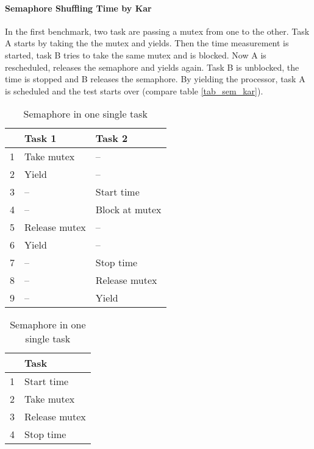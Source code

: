 \paragraph{Semaphore Shuffling Time by Kar}
In the first benchmark, two task are passing a mutex from one to the other.
Task A starts by taking the the mutex and yields.
Then the time measurement is started, task B tries to take the same mutex and is blocked.
Now A is rescheduled, releases the semaphore and yields again.
Task B is unblocked, the time is stopped and B releases the semaphore.
By yielding the processor, task A is scheduled and the test starts over (compare table \ref{tab_sem_kar}).

\begin{table}[htbp]
\begin{minipage}[t]{0.45\textwidth}
	\begin{center}
		\begin{tabular}{|l|l|l|}
			\hline
				& Task 1							& Task 2						\\
				\hline 
			  1 & Take mutex					& --								\\
			  2 & Yield								& --								\\
			  3 & --									& Start time				\\ 
			  4 & --									& Block at mutex		\\
			  5 & Release mutex				& --								\\
			  6 & Yield								& --								\\
			  7 & --									& Stop time					\\ 
			  8 & --									& Release mutex			\\
			  9 & --									& Yield							\\			  
			\hline
		\end{tabular}
	\caption{Semaphore Shuffling Time proposed by Kar}
	\label{tab_sem_kar}
	\end{center}
	\end{minipage} \hfill 
	\begin{minipage}[t]{0.45\textwidth}
	\begin{center}
		\begin{tabular}{|l|l|}
			\hline
				& Task 							\\
				\hline 
				1 & Start time				\\ 
			  2 & Take mutex				\\
				3 & Release mutex			\\						 
			  4 & Stop time					\\ 			  
			\hline
		\end{tabular}
	\caption{Semaphore in one single task}
	\label{tab_sem_single}
	\end{center}
	\end{minipage}
\end{table}


